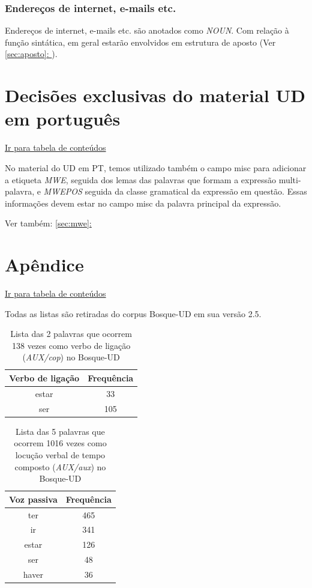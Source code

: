 \documentclass[output=paper,colorlinks,citecolor=brown]{langscibook}
\newcommand*{\fullref}[1]{\hyperref[{#1}]{\autoref*{#1}: \nameref*{#1}}} %
\begin{document}
		\subsection{Endereços de internet, e-mails etc.}
		
			Endereços de internet, e-mails etc. são anotados como \emph{NOUN}. Com relação à função sintática, em geral estarão envolvidos em estrutura de aposto (Ver \fullref{sec:aposto}).

\chapter{Decisões exclusivas do material UD em português}

\hyperlink{toc}{Ir para tabela de conteúdos\\}

	No material do UD em PT, temos utilizado também o campo misc para adicionar a etiqueta \emph{MWE}, seguida dos lemas das palavras que formam a expressão multi-palavra, e \emph{MWEPOS} seguida da classe gramatical da expressão em questão. Essas informações devem estar no campo misc da palavra principal da expressão.

	Ver também: \fullref{sec:mwe}

	

\chapter{Apêndice}

	\hyperlink{toc}{Ir para tabela de conteúdos\\}

	Todas as listas são retiradas do corpus Bosque-UD em sua versão 2.5.
	
	\begin{table}[]
		\centering
		\begin{tabular}{|c|c|}
			\hline
			\textbf{Verbo de ligação} & \textbf{Frequência} \\\hline
			estar & 33\\\hline
			ser & 105\\\hline
		\end{tabular}
		\caption{Lista das 2 palavras que ocorrem 138 vezes como verbo de ligação (\emph{AUX/cop}) no Bosque-UD}
		\label{tab:verbosdeligacao}
	\end{table}

	\begin{table}[]
		\centering
		\begin{tabular}{|c|c|}
			\hline
			\textbf{Voz passiva} & \textbf{Frequência} \\\hline
			ter & 465\\\hline
			ir & 341\\\hline
			estar & 126\\\hline
			ser & 48\\\hline
			haver & 36\\\hline
		\end{tabular}
		\caption{Lista das 5 palavras que ocorrem 1016 vezes como locução verbal de tempo composto (\emph{AUX/aux}) no Bosque-UD}
		\label{tab:loctempocomposto}
	\end{table}
\end{document}
